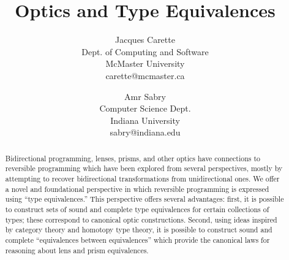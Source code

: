 \documentclass[sigplan,review,anonymous]{acmart}\settopmatter{printfolios=true,printccs=false,printacmref=false}
\title{Optics and Type Equivalences}
\author{
Jacques Carette\\ Dept. of Computing and Software\\
        McMaster University \\ carette@mcmaster.ca
\and
Amr Sabry \\ Computer Science Dept.\\
        Indiana University \\ sabry@indiana.edu
}
\begin{document}
\maketitle

\begin{abstract}
Bidirectional programming, lenses, prisms, and other optics have connections
to reversible programming which have been explored from several perspectives,
mostly by attempting to recover bidirectional transformations from unidirectional
ones. We offer a novel and foundational perspective in which reversible programming
is expressed using “type equivalences.” This perspective offers several advantages:
first, it is possible to construct sets of sound and complete type equivalences
for certain collections of types; these correspond to canonical optic constructions.
Second, using ideas inspired by category theory and homotopy type theory,
it is possible to construct sound and complete “equivalences between equivalences”
which provide the canonical laws for reasoning about lens and prism equivalences.
\end{abstract}
\vskip 32pt
\end{document}
